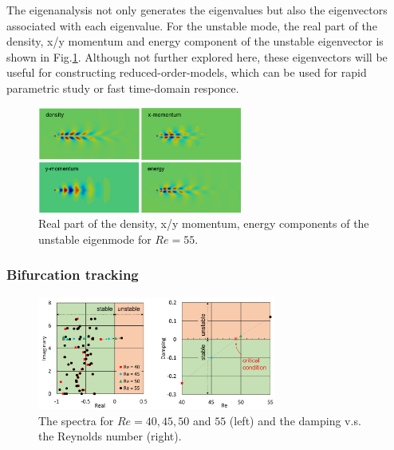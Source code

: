 \documentclass[journal,final]{new-aiaa}
\begin{document}
The eigenanalysis not only generates the eigenvalues but also the eigenvectors
associated with each eigenvalue. For the unstable mode, the real part of the
density, x/y momentum and energy component of the unstable eigenvector
is shown in Fig.\ref{fig:cyl-re55-eigenmode}. Although not further explored
here, these eigenvectors will be useful for constructing reduced-order-models,
which can be used for rapid parametric study or fast time-domain responce.
\begin{figure}[htb]
	\centering   
	\includegraphics[width=0.6\textwidth]{pic/eigenmode-real.png}	
	\caption{Real part of the density, x/y momentum, energy components
		of the unstable eigenmode for $Re=55$.}
	\label{fig:cyl-re55-eigenmode}
\end{figure}

\subsubsection{Bifurcation tracking}
\begin{figure}[htb]
	\centering   
	\includegraphics[width=0.7\textwidth]{pic/cylinder-bifurcation.png}	
	\caption{The spectra for $Re=40, 45, 50$ and $55$ (left) and the damping v.s. the Reynolds number (right).}
	\label{fig:cyl-bifur}
\end{figure}
\end{document}
